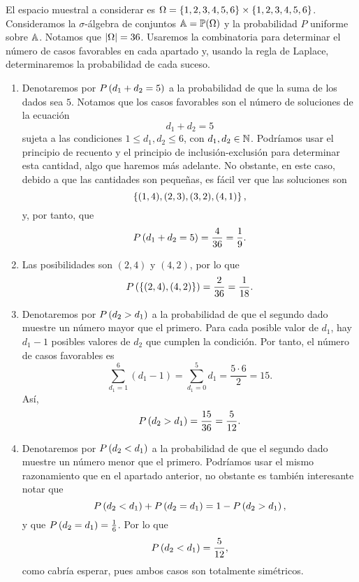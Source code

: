 \begin{solution}
  El espacio muestral a considerar es $\Omega = \left\lbrace1, 2, 3, 4, 5, 6\right\rbrace
  \times \left\lbrace1, 2, 3, 4, 5, 6\right\rbrace$. Consideramos la $\sigma$-álgebra de
  conjuntos $\mathbb{A} = \mathbb{P}(\Omega)$ y la probabilidad $P$ uniforme sobre
  $\mathbb{A}$. Notamos que $\left|\Omega\right| = 36$. Usaremos la combinatoria para
  determinar el número de casos favorables en cada apartado y, usando la
  regla de Laplace, determinaremos la probabilidad de cada suceso.

  \begin{enumerate}
    \item Denotaremos por $P\left(d_1 + d_2 = 5\right)$ a la probabilidad de que
    la suma de los dados sea $5$. Notamos que los casos favorables son el
    número de soluciones de la ecuación
    \[
      d_1 + d_2 = 5
    \]
    sujeta a las condiciones $1 \le d_1, d_2 \le 6$, con $d_1, d_2 \in
    \mathbb{N}$. Podríamos usar el principio de recuento
     y el principio de
    inclusión-exclusión para determinar esta cantidad, algo que haremos más
    adelante. No obstante, en este caso, debido a que las cantidades son
    pequeñas, es fácil ver que las soluciones son
    \[
      \left\lbrace(1, 4), (2, 3), (3, 2), (4, 1)\right\rbrace,
    \]
    y, por tanto, que
    \[
      P\left(d_1 + d_2 = 5\right) = \frac{4}{36} = \frac{1}{9}.
    \]
    \item Las posibilidades son $(2, 4)$ y $(4, 2)$, por lo que
    \[
      P\left(\left\lbrace(2, 4), (4, 2)\right\rbrace\right) = \frac{2}{36} = \frac{1}{18}.
    \]
    \item Denotaremos por $P\left(d_2 > d_1\right)$ a la probabilidad de que el
    segundo dado muestre un número mayor que el primero. Para cada posible
    valor de $d_1$, hay $d_1 - 1$ posibles valores de $d_2$ que cumplen la
    condición. Por tanto, el número de casos favorables es
    \[
      \sum_{d_1 = 1}^6 (d_1 - 1) =
      \sum_{d_1 = 0}^5 d_1 = \frac{5 \cdot 6}{2} = 15.
    \]
    Así,
    \[
      P\left(d_2 > d_1\right) = \frac{15}{36} = \frac{5}{12}.
    \]
    \item Denotaremos por $P\left(d_2 < d_1\right)$ a la probabilidad de que el
    segundo dado muestre un número menor que el primero. Podríamos usar el
    mismo razonamiento que en el apartado anterior, no obstante es también
    interesante notar que
    \[
      P\left(d_2 < d_1\right) + P\left(d_2 = d_1\right) = 1 - P\left(d_2 > d_1\right),
    \]
    y que $P\left(d_2 = d_1\right) = \frac{1}{6}$. Por lo que
    \[
      P\left(d_2 < d_1\right) = \frac{5}{12},
    \]
    como cabría esperar, pues ambos casos son totalmente simétricos.
  \end{enumerate}
\end{solution}

